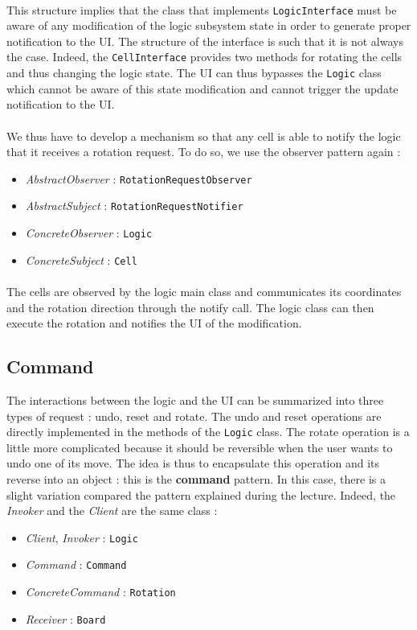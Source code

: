 \documentclass[a4paper,11pt]{article}
\begin{document}
\paragraph{}
 This structure implies that the class that implements \texttt{LogicInterface} must be aware of any modification of the logic subsystem state in order to generate proper notification to the UI. The structure of the interface is such that it is not always the case. Indeed, the \texttt{CellInterface} provides two methods for rotating the cells and thus changing the logic state. The UI can thus bypasses the \texttt{Logic} class which cannot be aware of this state modification and cannot trigger the update notification to the UI.
\\ \\ 
We thus have to develop a mechanism so that any cell is able to notify the logic that it receives a rotation request. To do so, we use the observer pattern again :
\begin{itemize}
	\item \textit{AbstractObserver} : \texttt{RotationRequestObserver}
	\item \textit{AbstractSubject} : \texttt{RotationRequestNotifier}
	\item \textit{ConcreteObserver} : \texttt{Logic}
	\item \textit{ConcreteSubject} : \texttt{Cell}
\end{itemize}
\paragraph{}
The cells are observed by the logic main class and communicates its coordinates and the rotation direction through the notify call. The logic class can then execute the rotation and notifies the UI of the modification.
\subsection{Command}
The interactions between the logic and the UI can be summarized into three types of request : undo, reset and rotate.  The undo and reset operations are directly implemented in the methods of the \texttt{Logic} class. The rotate operation is a little more complicated because it should be reversible when the user wants to undo one of its move. The idea is thus to encapsulate this operation and its reverse into an object : this is the \textbf{command} pattern. In this case, there is a slight variation compared the pattern explained during the lecture. Indeed, the \textit{Invoker} and the \textit{Client} are the same class : 
\begin{itemize}
	\item \textit{Client}, \textit{Invoker} : \texttt{Logic}
	\item \textit{Command} : \texttt{Command}
	\item \textit{ConcreteCommand} : \texttt{Rotation}
	\item \textit{Receiver} : \texttt{Board}
\end{itemize}
\end{document}
